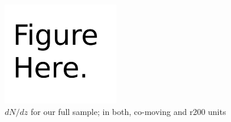 \begin{figure}
 \begin{minipage}{0.5\textwidth}
    \centering
    \includegraphics[width=5cm]{figs/figure_sample.pdf}
  \end{minipage}

\caption{$dN/dz$ for our full sample; in both, co-moving and r200 units}
\label{fig:fig2}

\end{figure}
